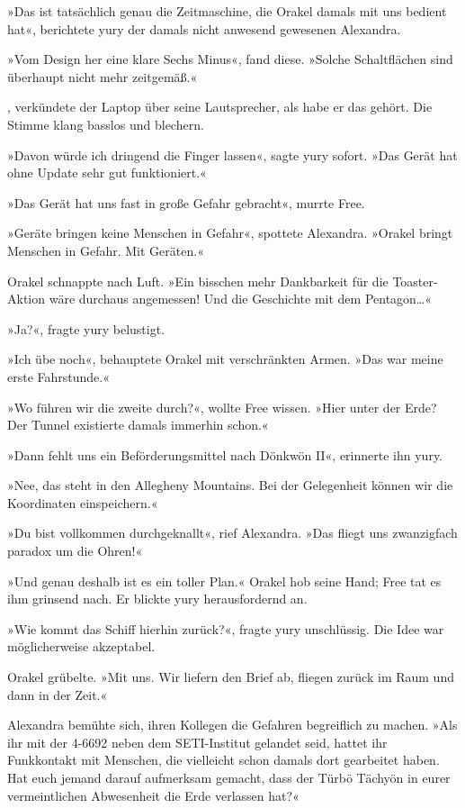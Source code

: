 »Das ist tatsächlich genau die Zeitmaschine, die Orakel damals mit uns bedient hat«, berichtete yury der damals nicht anwesend gewesenen Alexandra.

»Vom Design her eine klare Sechs Minus«, fand diese. »Solche Schaltflächen sind überhaupt nicht mehr zeitgemäß.«

, verkündete der Laptop über seine Lautsprecher, als habe er das gehört. Die Stimme klang basslos und blechern.

»Davon würde ich dringend die Finger lassen«, sagte yury sofort. »Das Gerät hat ohne Update sehr gut funktioniert.«

»Das Gerät hat uns fast in große Gefahr gebracht«, murrte Free.

»Geräte bringen keine Menschen in Gefahr«, spottete Alexandra. »Orakel bringt Menschen in Gefahr. Mit Geräten.«

Orakel schnappte nach Luft. »Ein bisschen mehr Dankbarkeit für die Toaster-Aktion wäre durchaus angemessen! Und die Geschichte mit dem Pentagon…«

»Ja?«, fragte yury belustigt.

»Ich übe noch«, behauptete Orakel mit verschränkten Armen. »Das war meine erste Fahrstunde.«

»Wo führen wir die zweite durch?«, wollte Free wissen. »Hier unter der Erde? Der Tunnel existierte damals immerhin schon.«

»Dann fehlt uns ein Beförderungsmittel nach Dönkwön II«, erinnerte ihn yury.

»Nee, das steht in den Allegheny Mountains. Bei der Gelegenheit können wir die Koordinaten einspeichern.«

»Du bist vollkommen durchgeknallt«, rief Alexandra. »Das fliegt uns zwanzigfach paradox um die Ohren!«

»Und genau deshalb ist es ein toller Plan.« Orakel hob seine Hand; Free tat es ihm grinsend nach. Er blickte yury herausfordernd an.

»Wie kommt das Schiff hierhin zurück?«, fragte yury unschlüssig. Die Idee war möglicherweise akzeptabel.

Orakel grübelte. »Mit uns. Wir liefern den Brief ab, fliegen zurück im Raum und dann in der Zeit.«

Alexandra bemühte sich, ihren Kollegen die Gefahren begreiflich zu machen. »Als ihr mit der 4-6692 neben dem SETI-Institut gelandet seid, hattet ihr Funkkontakt mit Menschen, die vielleicht schon damals dort gearbeitet haben. Hat euch jemand darauf aufmerksam gemacht, dass der Türbö Tächyön in eurer vermeintlichen Abwesenheit die Erde verlassen hat?«

